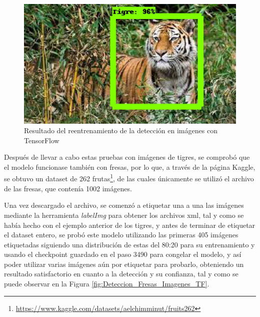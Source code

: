 \begin{figure}[H]
\begin{minipage}{0.46\textwidth}
  \end{minipage}
  \hspace{2mm}
  \begin{minipage}{0.46\textwidth}
    \centering
    \includegraphics[width=\linewidth]{figs/tigre_5_v2.jpeg}
  \end{minipage}
  \caption{Resultado del reentrenamiento de la detección en imágenes con TensorFlow}
  \label{fig:deteccion_tensorflow_tigres_v2}
  \end{figure}

\pagebreak
Después de llevar a cabo estas pruebas con imágenes de tigres, se comprobó que el modelo funcionase también con fresas, por lo que, a través de la página Kaggle, se obtuvo un dataset de 262 frutas\footnote{\url{https://www.kaggle.com/datasets/aelchimminut/fruits262}}, de las cuales únicamente se utilizó el archivo de las fresas, que contenía 1002 imágenes.

Una vez descargado el archivo, se comenzó a etiquetar una a una las imágenes mediante la herramienta \textit{labelImg} para obtener los archivos xml, tal y como se había hecho con el ejemplo anterior de los tigres, y antes de terminar de etiquetar el dataset entero, se probó este modelo utilizando las primeras 405 imágenes etiquetadas siguiendo una distribución de estas del 80:20 para su entrenamiento y usando el checkpoint guardado en el paso 3490 para congelar el modelo, y así poder utilizar varias imágenes aún por etiquetar para probarlo, obteniendo un resultado satisfactorio en cuanto a la detección y su confianza, tal y como se puede observar en la Figura \ref{fig:Deteccion_Fresas_Imagenes_TF}.

